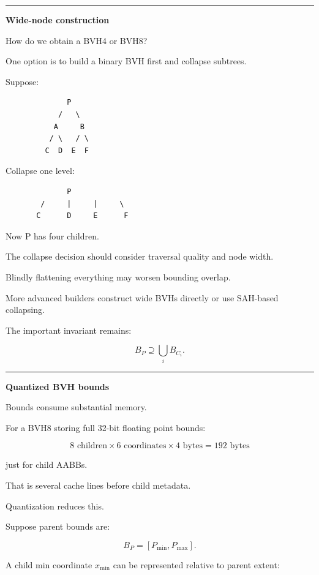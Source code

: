 \begin{center}\rule{0.5\linewidth}{0.5pt}\end{center}

\textbf{Wide-node construction}

How do we obtain a BVH4 or BVH8?

One option is to build a binary BVH first and collapse subtrees.

Suppose:

\begin{verbatim}
              P
            /   \
           A     B
          / \   / \
         C  D  E  F
\end{verbatim}

Collapse one level:

\begin{verbatim}
              P
        /     |     |     \
       C      D     E      F
\end{verbatim}

Now P has four children.

The collapse decision should consider traversal quality and node width.

Blindly flattening everything may worsen bounding overlap.

More advanced builders construct wide BVHs directly or use SAH-based collapsing.

The important invariant remains:

\[
B_P
\supseteq
\bigcup_iB_{C_i}.
\]

\begin{center}\rule{0.5\linewidth}{0.5pt}\end{center}

\textbf{Quantized BVH bounds}

Bounds consume substantial memory.

For a BVH8 storing full 32-bit floating point bounds:

\[
8\text{ children}
\times
6\text{ coordinates}
\times
4\text{ bytes}
=
192\text{ bytes}
\]

just for child AABBs.

That is several cache lines before child metadata.

Quantization reduces this.

Suppose parent bounds are:

\[
B_P=[P_{\min},P_{\max}].
\]

A child min coordinate \(x_{\min}\) can be represented relative to parent extent:

